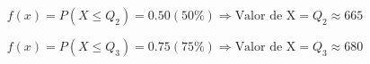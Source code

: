 \documentclass{exam}
\begin{document}
\begin{questions}
\begin{parts}
\begin{solution}
            \begin{equation}
                f(x) = P(X \leq Q_2) = 0.50 (50\%) \Longrightarrow \textrm{Valor de X} = Q_2 \approx 665
            \end{equation}

            \begin{equation}
                f(x) = P(X \leq Q_3) = 0.75 (75\%) \Longrightarrow \textrm{Valor de X} = Q_3 \approx 680
            \end{equation}
                
            \end{solution} 
        \end{parts}

 
\end{questions}
\end{document}
